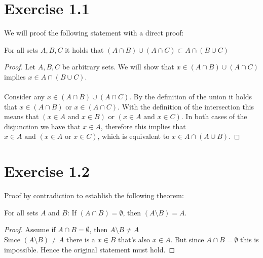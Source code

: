 \documentclass{article} %
\newcommand{\homeworkNumber}{1}
\begin{document}
\section*{Exercise \homeworkNumber.1}
We will proof the following statement with a direct proof:
\begin{center}
	For all sets \( A, B, C \) it holds that \( (A \cap B) \cup (A \cap C) \subset A \cap (B \cup C) \)
\end{center}

\begin{proof}
	Let \( A, B, C \) be arbitrary sets. We will show that \( x \in  (A \cap B) \cup (A \cap C)\) implies \( x \in A \cap (B \cup C)\).
	\\
	\\
	Consider any \( x \in (A \cap B) \cup (A \cap C) \).
	By the definition of the union it holds that \( x \in (A \cap B) \) or \( x \in (A \cap C) \).
	With the definition of the intersection this means that \( (x \in A \text{ and } x \in B) \text{ or } (x \in A \text{ and } x \in  C) \).
	In both cases of the disjunction we have that \( x \in A \),
	therefore this implies that \( x \in  A \text{ and } (x \in A \text{ or }x \in C) \),
	which is equivalent to \( x \in A \cap (A \cup B) \).
\end{proof}

\section*{Exercise \homeworkNumber.2}
Proof by contradiction to establish the following theorem:
\begin{center}
	For all sets $A$ and $B$: If $(A \cap B) = \emptyset$, then $(A \setminus B) = A$.
\end{center}
\begin{proof}
	Assume if $A \cap B = \emptyset$, then $A\setminus B \neq A$ \\
	Since $(A \setminus B) \neq A$ there is a $x \in B$ that's also $x \in A$. But since $A \cap B = \emptyset$ this is impossible. Hence the original statement must hold.
\end{proof}
\end{document}
